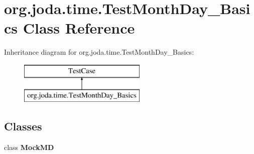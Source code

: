 \hypertarget{classorg_1_1joda_1_1time_1_1_test_month_day___basics}{\section{org.\-joda.\-time.\-Test\-Month\-Day\-\_\-\-Basics Class Reference}
\label{classorg_1_1joda_1_1time_1_1_test_month_day___basics}
}
Inheritance diagram for org.\-joda.\-time.\-Test\-Month\-Day\-\_\-\-Basics\-:\begin{figure}[H]
\begin{center}
\leavevmode
\includegraphics[height=2.000000cm]{classorg_1_1joda_1_1time_1_1_test_month_day___basics}
\end{center}
\end{figure}
\subsection*{Classes}
\begin{DoxyCompactItemize}
\item 
class {\bfseries Mock\-M\-D}
\end{DoxyCompactItemize}
